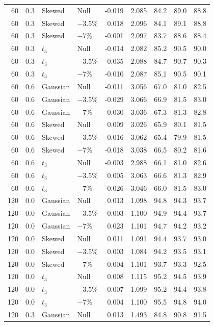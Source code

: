 \begin{longtable}{rrllrrrrr}
60 & 0.3 & Skewed & Null & -0.019 & 2.085 & 84.2 & 89.0 & 88.8 \\
60 & 0.3 & Skewed & $-3.5\%$ & 0.018 & 2.096 & 84.1 & 89.1 & 88.8 \\
60 & 0.3 & Skewed & $-7\%$ & -0.001 & 2.097 & 83.7 & 88.6 & 88.4 \\
60 & 0.3 & $t_3$ & Null & -0.014 & 2.082 & 85.2 & 90.5 & 90.0 \\
60 & 0.3 & $t_3$ & $-3.5\%$ & 0.035 & 2.088 & 84.7 & 90.7 & 90.3 \\
60 & 0.3 & $t_3$ & $-7\%$ & -0.010 & 2.087 & 85.1 & 90.5 & 90.1 \\
60 & 0.6 & Gaussian & Null & -0.011 & 3.056 & 67.0 & 81.0 & 82.5 \\
60 & 0.6 & Gaussian & $-3.5\%$ & -0.029 & 3.066 & 66.9 & 81.5 & 83.0 \\
60 & 0.6 & Gaussian & $-7\%$ & 0.030 & 3.036 & 67.3 & 81.3 & 82.8 \\
60 & 0.6 & Skewed & Null & 0.009 & 3.026 & 65.9 & 80.1 & 81.5 \\
60 & 0.6 & Skewed & $-3.5\%$ & -0.016 & 3.062 & 65.4 & 79.9 & 81.5 \\
60 & 0.6 & Skewed & $-7\%$ & -0.018 & 3.038 & 66.5 & 80.2 & 81.6 \\
60 & 0.6 & $t_3$ & Null & -0.003 & 2.988 & 66.1 & 81.0 & 82.6 \\
60 & 0.6 & $t_3$ & $-3.5\%$ & 0.005 & 3.063 & 66.6 & 81.3 & 82.9 \\
60 & 0.6 & $t_3$ & $-7\%$ & 0.026 & 3.046 & 66.0 & 81.5 & 83.0 \\
120 & 0.0 & Gaussian & Null & 0.013 & 1.098 & 94.8 & 94.3 & 93.7 \\
120 & 0.0 & Gaussian & $-3.5\%$ & 0.003 & 1.100 & 94.9 & 94.4 & 93.7 \\
120 & 0.0 & Gaussian & $-7\%$ & 0.023 & 1.101 & 94.7 & 94.2 & 93.2 \\
120 & 0.0 & Skewed & Null & 0.011 & 1.091 & 94.4 & 93.7 & 93.0 \\
120 & 0.0 & Skewed & $-3.5\%$ & 0.003 & 1.084 & 94.2 & 93.5 & 93.1 \\
120 & 0.0 & Skewed & $-7\%$ & -0.004 & 1.101 & 93.7 & 93.3 & 92.5 \\
120 & 0.0 & $t_3$ & Null & 0.008 & 1.115 & 95.2 & 94.5 & 93.9 \\
120 & 0.0 & $t_3$ & $-3.5\%$ & -0.007 & 1.099 & 95.2 & 94.4 & 93.8 \\
120 & 0.0 & $t_3$ & $-7\%$ & 0.004 & 1.100 & 95.5 & 94.8 & 94.0 \\
120 & 0.3 & Gaussian & Null & 0.013 & 1.493 & 84.8 & 90.8 & 91.5 \\

\end{longtable}
